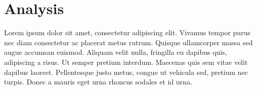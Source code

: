 \chapter{Analysis}

Lorem ipsum dolor sit amet, consectetur adipiscing elit. Vivamus tempor purus nec diam consectetur ac placerat metus rutrum. Quisque ullamcorper massa sed augue accumsan euismod. Aliquam velit nulla, fringilla eu dapibus quis, adipiscing a risus. Ut semper pretium interdum. Maecenas quis sem vitae velit dapibus laoreet. Pellentesque justo metus, congue ut vehicula sed, pretium nec turpis. Donec a mauris eget urna rhoncus sodales et id urna.





